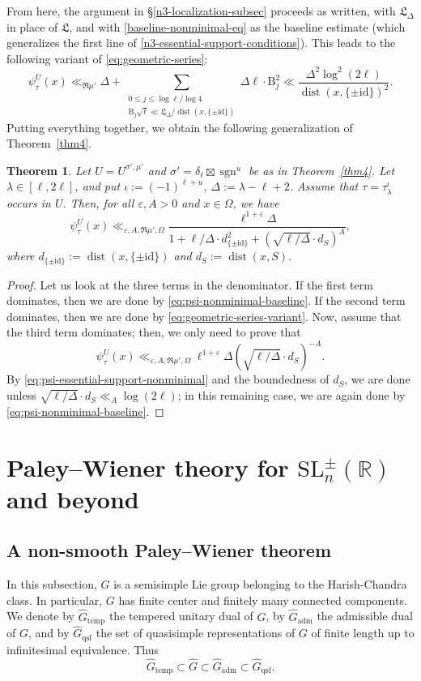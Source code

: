 \documentclass[11pt,oneside]{amsart}
\numberwithin{equation}{section}
\theoremstyle{remark}
\theoremstyle{plain}
\newtheorem{theorem}{Theorem}
\DeclareMathOperator{\dist}{dist}
\DeclareMathOperator{\sgn}{sgn}
\newcommand\SL{\mathrm{SL}}
\newcommand\id{\mathrm{id}}
\newcommand\BB{\mathrm{B}}
\newcommand\RR{\mathbb{R}}
\newcommand\eps{\varepsilon}
\renewcommand\leq{\leqslant}
\newcommand\Gtemp{\widehat{G}_\mathrm{temp}}
\newcommand\Gadm{\widehat{G}_\mathrm{adm}}
\newcommand\Gqsf{\widehat{G}_\mathrm{qsf}}
\begin{document}
From here, the argument in \S\ref{n3-localization-subsec} proceeds as written, with $\mathfrak{L}_{\Delta}$ in place of $\mathfrak{L}$, and with \eqref{baseline-nonminimal-eq} as the baseline estimate (which generalizes the first line of \eqref{n3-essential-support-conditions}). This leads to the following variant of \eqref{eq:geometric-series}:
\begin{equation}\label{eq:geometric-series-variant}
\psi_{\tau}^U(x)\ll_{\Re\mu'}
\Delta+\sum_{\substack{0\leq j\leq\log\ell/\log 4\\ \BB_j\sqrt{\ell}\ll \mathfrak{L}_{\Delta}/\dist(x,\{\pm\id\})}} \Delta\ell\cdot \BB_j^2 \ll
\frac{ \Delta^2 \log^2(2\ell)}{\dist(x,\{\pm\id\})^2}.
\end{equation}
Putting everything together, we obtain the following generalization of Theorem~\ref{thm4}.

\begin{theorem}\label{thm4b}
Let $U=U^{\sigma',\mu'}$ and $\sigma'=\delta_{\ell}\boxtimes\sgn^u$ be as in Theorem~\ref{thm4}. Let $\lambda\in[\ell,2\ell]$, and put $\iota:=(-1)^{\ell+u}$, $\Delta:=\lambda-\ell+2$. Assume that $\tau=\tau_{\lambda}^{\iota}$ occurs in $U$. Then, for all $\eps,A>0$ and $x\in\Omega$, we have
\[\psi^{U}_{\tau} (x)\ll_{\eps, A,\Re\mu',\Omega}
\frac{\ell^{1+\eps}\Delta}{1 + \ell/\Delta \cdot d_{\{\pm\id\}}^2+ (\sqrt{\ell/\Delta} \cdot d_S)^A}, \]
where $d_{\{\pm\id\}}:=\dist(x,\{\pm\id\})$ and $d_S:=\dist(x,S)$.
\end{theorem}
\begin{proof} Let us look at the three terms in the denominator. If the first term dominates, then we are done by \eqref{eq:psi-nonminimal-baseline}. If the second term dominates, then we are done by \eqref{eq:geometric-series-variant}. Now, assume that the third term dominates; then, we only need to prove that
\[\psi^{U}_{\tau} (x)\ll_{\eps, A,\Re\mu',\Omega}\ell^{1+\eps}\Delta(\sqrt{\ell/\Delta} \cdot d_S)^{-A}.\]
By \eqref{eq:psi-essential-support-nonminimal} and the boundedness of $d_S$, we are done unless $\sqrt{\ell/\Delta}\cdot d_S\ll_A\log(2\ell)$;
in this remaining case, we are again done by \eqref{eq:psi-nonminimal-baseline}.
\end{proof}

\section{Paley--Wiener theory for $\SL_n^{\pm}(\RR)$ and beyond}\label{PWsection}

\subsection{A non-smooth Paley--Wiener theorem}
In this subsection, $G$ is a semisimple Lie group belonging to the Harish-Chandra class. In particular, $G$ has finite center and finitely many connected components. We denote by $\Gtemp$ the tempered unitary dual of $G$, by $\Gadm$ the admissible dual of $G$, and by $\Gqsf$ the set of quasisimple representations of $G$ of finite length up to infinitesimal equivalence. Thus
\[\Gtemp\subset\widehat{G}\subset\Gadm\subset\Gqsf.\]
\end{document}
